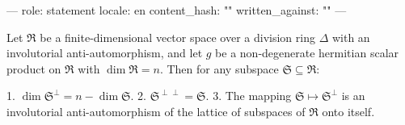 ---
role: statement
locale: en
content_hash: ""
written_against: ""
---

Let $\mathfrak{R}$ be a finite-dimensional vector space over a division ring $\Delta$ with an involutorial anti-automorphism, and let $g$ be a non-degenerate hermitian scalar product on $\mathfrak{R}$ with $\dim \mathfrak{R} = n$. Then for any subspace $\mathfrak{S} \subseteq \mathfrak{R}$:

1. $\dim \mathfrak{S}^{\perp} = n - \dim \mathfrak{S}$.
2. $\mathfrak{S}^{\perp\perp} = \mathfrak{S}$.
3. The mapping $\mathfrak{S} \mapsto \mathfrak{S}^{\perp}$ is an involutorial anti-automorphism of the lattice of subspaces of $\mathfrak{R}$ onto itself.
